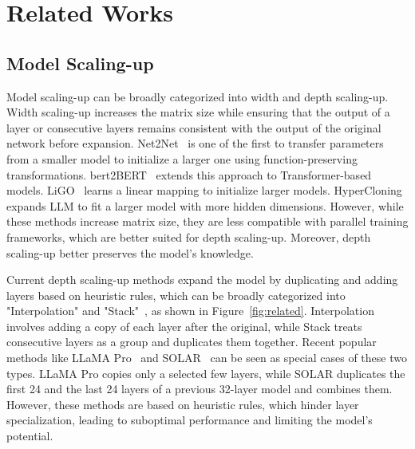 \section{Related Works}
\subsection{Model Scaling-up}
Model scaling-up can be broadly categorized into width and depth scaling-up. Width scaling-up increases the matrix size while ensuring that the output of a layer or consecutive layers remains consistent with the output of the original network before expansion. Net2Net~\cite{chen2015net2net} is one of the first to transfer parameters from a smaller model to initialize a larger one using function-preserving transformations. bert2BERT~\cite{chen2021bert2bert} extends this approach to Transformer-based models. LiGO~\cite{wang2023learning} learns a linear mapping to initialize larger models. HyperCloning~\cite{samragh2024scaling} expands LLM to fit a larger model with more hidden dimensions. However, while these methods increase matrix size, they are less compatible with parallel training frameworks, which are better suited for depth scaling-up. Moreover, depth scaling-up better preserves the model's knowledge.


Current depth scaling-up methods expand the model by duplicating and adding layers based on heuristic rules, which can be broadly categorized into "Interpolation" and "Stack"~\cite{pan2024preparing}, as shown in Figure~\ref{fig:related}. Interpolation involves adding a copy of each layer after the original, while Stack treats consecutive layers as a group and duplicates them together. Recent popular methods like LLaMA Pro~\cite{wu2024llama} and SOLAR~\cite{kim2023solar} can be seen as special cases of these two types. LLaMA Pro copies only a selected few layers, while SOLAR duplicates the first 24 and the last 24 layers of a previous 32-layer model and combines them. However, these methods are based on heuristic rules, which hinder layer specialization, leading to suboptimal performance and limiting the model's potential.

